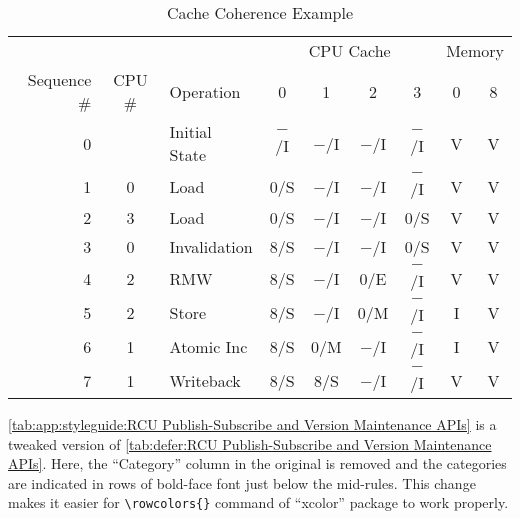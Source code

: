 \begin{table*}[tbh]
\small
\centering
\renewcommand*{\arraystretch}{1.2}
%
\begin{tabular}{rclcccccc}
	\toprule
	& & & \multicolumn{4}{c}{CPU Cache} & \multicolumn{2}{c}{Memory} \\
	\cmidrule(lr){4-7} \cmidrule(l){8-9}
	Sequence \# & CPU \# & Operation & 0 & 1 & 2 & 3 & 0 & 8 \\
	\cmidrule(r){1-3} \cmidrule(lr){4-7} \cmidrule(l){8-9}
	0 &   & Initial State	& $-$/I & $-$/I & $-$/I & $-$/I   & V & V \\
	1 & 0 & Load		& 0/S &   $-$/I & $-$/I & $-$/I   & V & V \\
	2 & 3 & Load		& 0/S &   $-$/I & $-$/I & 0/S     & V & V \\
	3 & 0 & Invalidation	& 8/S &   $-$/I & $-$/I & 0/S     & V & V \\
	4 & 2 & RMW		& 8/S &   $-$/I & 0/E &   $-$/I   & V & V \\
	5 & 2 & Store		& 8/S &   $-$/I & 0/M &   $-$/I   & I & V \\
	6 & 1 & Atomic Inc	& 8/S &   0/M &   $-$/I & $-$/I   & I & V \\
	7 & 1 & Writeback	& 8/S &   8/S &   $-$/I & $-$/I   & V & V \\
	\bottomrule
\end{tabular}
\caption{Cache Coherence Example}
\label{tab:app:styleguide:Cache Coherence Example}
\end{table*}

\cref{tab:app:styleguide:RCU Publish-Subscribe and Version Maintenance APIs}
is a tweaked version of
\cref{tab:defer:RCU Publish-Subscribe and Version Maintenance APIs}.
Here, the ``Category'' column in the original is removed
and the categories are indicated in rows of bold-face font
just below the mid-rules. This change makes it easier for
\verb|\rowcolors{}| command of ``xcolor'' package to work
properly.

